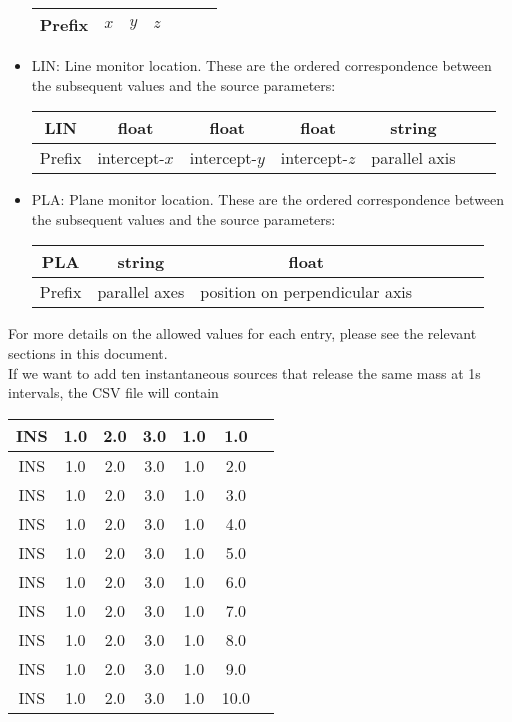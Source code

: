 \documentclass[]{article}
\begin{document}
\begin{itemize}
\begin{center}
\begin{tabular}{|c|c|c|c|c|c|c|}
            Prefix & $x$ & $y$ & $z$ & & & \\\hline
        \end{tabular}
    \end{center}
    \item LIN: Line monitor location. These are the ordered correspondence
    between the subsequent values and the source parameters:
    \begin{center}
        \begin{tabular}{|c|c|c|c|c|c|c|}\hline
            LIN & float & float & float & string &  & \\\hline
            Prefix & intercept-$x$ & intercept-$y$ & intercept-$z$ & parallel axis & & \\\hline
        \end{tabular}
    \end{center}
    \item PLA: Plane monitor location. These are the ordered correspondence
    between the subsequent values and the source parameters:
    \begin{center}
        \begin{tabular}{|c|c|c|c|c|c|c|}\hline
            PLA & string & float &  &  &  & \\\hline
            Prefix & parallel axes & position on perpendicular axis&  &  &  & \\\hline
        \end{tabular}
    \end{center}
\end{itemize}

For more details on the allowed values for each entry, please see the relevant
sections in this document.\\

\noindent If we want to add ten instantaneous sources that release the same mass
at 1s intervals, the CSV file will contain
\begin{center}
    \begin{tabular}{|c|c|c|c|c|c|c|}\hline
        INS & 1.0 & 2.0 & 3.0 & 1.0 & 1.0 & \\\hline
        INS & 1.0 & 2.0 & 3.0 & 1.0 & 2.0 & \\\hline
        INS & 1.0 & 2.0 & 3.0 & 1.0 & 3.0 & \\\hline
        INS & 1.0 & 2.0 & 3.0 & 1.0 & 4.0 & \\\hline
        INS & 1.0 & 2.0 & 3.0 & 1.0 & 5.0 & \\\hline
        INS & 1.0 & 2.0 & 3.0 & 1.0 & 6.0 & \\\hline
        INS & 1.0 & 2.0 & 3.0 & 1.0 & 7.0 & \\\hline
        INS & 1.0 & 2.0 & 3.0 & 1.0 & 8.0 & \\\hline
        INS & 1.0 & 2.0 & 3.0 & 1.0 & 9.0 & \\\hline
        INS & 1.0 & 2.0 & 3.0 & 1.0 & 10.0 & \\\hline
    \end{tabular}
\end{center}
\end{document}

